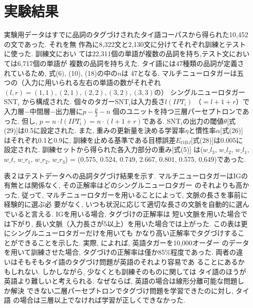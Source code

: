 \vspace*{-3.5mm}
\section{実験結果}
\vspace*{-2.5mm}

実験用データはすでに品詞のタグづけされたタイ語コーパスから得られた10,452
の文であった. それを無
作為に8,322文と2,130文に分けてそれぞれ訓練とテストに使った. 訓練文におい
ては22,311個の単語が複数の品詞を持ち,テスト文においては6,717個の単語が
複数の品詞を持ちえた. 
タイ語には47種類の品詞が定義されているため, 式(6), (10), (18)の中の$n$は
47となる. マルチニューロタガーは五つの（入力に用いられる左右の単語の数がそれぞれ
$(l, r)=(1,1), (2,1), (2,2), (3,2), (3,3)$の）
シングルニューロタガーSNT$_{i}$
から構成された. 個々のタガーSNT$_{i}$は入力長さ$l(IPT_{i})$ （$=l+1+r$）で入力層$-$中間層$-$出力層に$p-\frac{p}{2}-n$
個のユニットを持つ三層パーセプトロンであった. 但し,
$p=n \cdot l(IPT_{i})=n \cdot (l+1+r)$である.
SNT$_{i}$の出力の閾値$\theta$[式(29)]は0.5に設定された.
また, 重みの更新量を決める学習率$\eta$と慣性率$\alpha$[式(26)]はそれぞれ0.1と0.9に, 
訓練を止める基準である目標誤差$E_{OBJ}$[式(28)]は0.005に設定された. 
訓練セットから得られた各入力部分の重み[式(5)]
は($w\_l_{3}$, $w\_l_{2}$, $w\_l_{1}$, $w\_t$, $w\_r_{1}$,
$w\_r_{2}$, $w\_r_{3}$) = (0.575, 0.524, 0.749, 2.667, 0.801, 0.575,
0.649)であった. 

表２はテストデータへの品詞タグづけ結果を示す. 
マルチニューロタガーはIGの有無とは関係なく, その正解率はどのシングルニューロタガー
のそれよりも高かった. 従って, 
マルチニューロタガーを用いることによって, 文脈の長さを事前に経験的に選ぶ必
要がなく, いつも状況に応じて適切な長さの文脈を自動的に選んでいると言える.
IGを用いる場合, タグづけの正解率は
短い文脈を用いた場合では下がり, 
長い文脈（入力長さが5以上）を用いた場合では上がった. 
この表は更にシングルニューロタガーだけを用いても
かなり高い正解率でタグづけすることができることを示した.
実際, \cite{schmid}によれば, 英語タガーを10,000オーダー
のデータを用いて訓練させた場合, タグづけの正解率は僅か85\%程度であった.
両者の違いはそもそもタイ語のタグづけ問題が英語のそれより容易であ
ることにあるかもしれない.
しかしながら, 少なくとも訓練そのものに関しては
タイ語のほうが英語より難しいと考えられる. なぜならば, 
英語の場合は線形分離可能な問題しか解決
できない二層パーセプトロンでタグづけ問題を学習できたのに対し, タイ語
の場合は三層以上でなければ学習が正しくできなかった.

